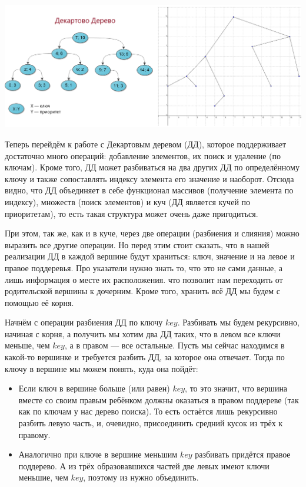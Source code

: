 \includegraphics[scale=0.45]{img/treap.png}

Теперь перейдём к работе с Декартовым деревом (ДД), которое поддерживает достаточно много операций: добавление элементов, их поиск и удаление (по ключам). Кроме того, ДД может разбиваться на два других ДД по определённому ключу и также сопоставлять индексу элемента его значение и наоборот. Отсюда видно, что ДД объединяет в себе функционал массивов (получение элемента по индексу), множеств (поиск элементов) и куч (ДД является кучей по приоритетам), то есть такая структура может очень даже пригодиться.

При этом, так же, как и в куче, через две операции (разбиения и слияния) можно выразить все другие операции. Но перед этим стоит сказать, что в нашей реализации ДД в каждой вершине будут храниться: ключ, значение и  на левое и правое поддеревья. Про указатели нужно знать то, что это не сами данные, а лишь информация о месте их расположения. что позволит нам переходить от родительской вершины к дочерним. Кроме того, хранить всё ДД мы будем с помощью её корня.

Начнём с операции разбиения ДД по ключу $key$. Разбивать мы будем рекурсивно, начиная с корня, а получить мы хотим два ДД таких, что в левом все ключи меньше, чем $key$, а в правом — все остальные. Пусть мы сейчас находимся в какой-то вершинке и требуется разбить ДД, за которое она отвечает. Тогда по ключу в вершине мы можем понять, куда она пойдёт: 

\begin{itemize}
    \item Если ключ в вершине больше (или равен) $key$, то это значит, что вершина вместе со своим правым ребёнком должны оказаться в правом поддереве (так как по ключам у нас дерево поиска). То есть остаётся лишь рекурсивно разбить левую часть, и, очевидно, присоединить средний кусок из трёх к правому.
    \item Аналогично при ключе в вершине меньшим $key$ разбивать придётся правое поддерево. А из трёх образовавшихся частей две левых имеют ключи меньшие, чем $key$, поэтому из нужно объединить.
\end{itemize}

